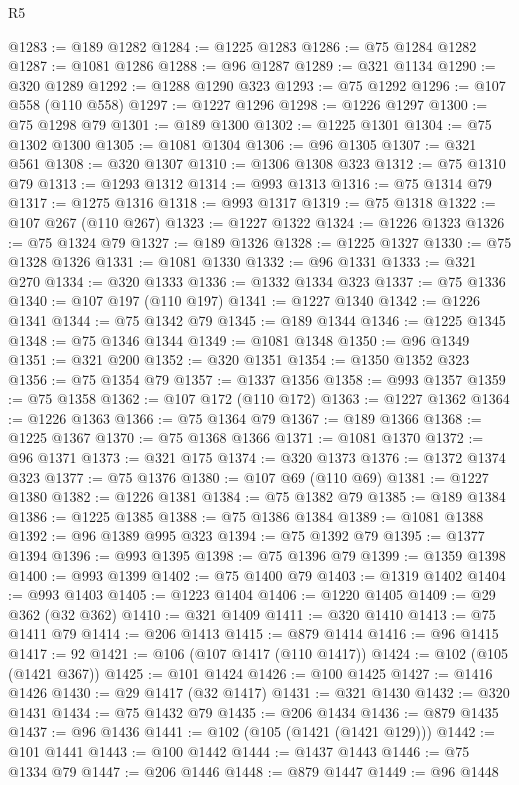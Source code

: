 \begin{lexlean}{R5}
\begin{coremodule}
@1283 := @189 @1282
@1284 := @1225 @1283
@1286 := @75 @1284 @1282
@1287 := @1081 @1286
@1288 := @96 @1287
@1289 := @321 @1134
@1290 := @320 @1289
@1292 := @1288 @1290 @323
@1293 := @75 @1292
@1296 := @107 @558 (@110 @558)
@1297 := @1227 @1296
@1298 := @1226 @1297
@1300 := @75 @1298 @79
@1301 := @189 @1300
@1302 := @1225 @1301
@1304 := @75 @1302 @1300
@1305 := @1081 @1304
@1306 := @96 @1305
@1307 := @321 @561
@1308 := @320 @1307
@1310 := @1306 @1308 @323
@1312 := @75 @1310 @79
@1313 := @1293 @1312
@1314 := @993 @1313
@1316 := @75 @1314 @79
@1317 := @1275 @1316
@1318 := @993 @1317
@1319 := @75 @1318
@1322 := @107 @267 (@110 @267)
@1323 := @1227 @1322
@1324 := @1226 @1323
@1326 := @75 @1324 @79
@1327 := @189 @1326
@1328 := @1225 @1327
@1330 := @75 @1328 @1326
@1331 := @1081 @1330
@1332 := @96 @1331
@1333 := @321 @270
@1334 := @320 @1333
@1336 := @1332 @1334 @323
@1337 := @75 @1336
@1340 := @107 @197 (@110 @197)
@1341 := @1227 @1340
@1342 := @1226 @1341
@1344 := @75 @1342 @79
@1345 := @189 @1344
@1346 := @1225 @1345
@1348 := @75 @1346 @1344
@1349 := @1081 @1348
@1350 := @96 @1349
@1351 := @321 @200
@1352 := @320 @1351
@1354 := @1350 @1352 @323
@1356 := @75 @1354 @79
@1357 := @1337 @1356
@1358 := @993 @1357
@1359 := @75 @1358
@1362 := @107 @172 (@110 @172)
@1363 := @1227 @1362
@1364 := @1226 @1363
@1366 := @75 @1364 @79
@1367 := @189 @1366
@1368 := @1225 @1367
@1370 := @75 @1368 @1366
@1371 := @1081 @1370
@1372 := @96 @1371
@1373 := @321 @175
@1374 := @320 @1373
@1376 := @1372 @1374 @323
@1377 := @75 @1376
@1380 := @107 @69 (@110 @69)
@1381 := @1227 @1380
@1382 := @1226 @1381
@1384 := @75 @1382 @79
@1385 := @189 @1384
@1386 := @1225 @1385
@1388 := @75 @1386 @1384
@1389 := @1081 @1388
@1392 := @96 @1389 @995 @323
@1394 := @75 @1392 @79
@1395 := @1377 @1394
@1396 := @993 @1395
@1398 := @75 @1396 @79
@1399 := @1359 @1398
@1400 := @993 @1399
@1402 := @75 @1400 @79
@1403 := @1319 @1402
@1404 := @993 @1403
@1405 := @1223 @1404
@1406 := @1220 @1405
@1409 := @29 @362 (@32 @362)
@1410 := @321 @1409
@1411 := @320 @1410
@1413 := @75 @1411 @79
@1414 := @206 @1413
@1415 := @879 @1414
@1416 := @96 @1415
@1417 := 92
@1421 := @106 (@107 @1417 (@110 @1417))
@1424 := @102 (@105 (@1421 @367))
@1425 := @101 @1424
@1426 := @100 @1425
@1427 := @1416 @1426
@1430 := @29 @1417 (@32 @1417)
@1431 := @321 @1430
@1432 := @320 @1431
@1434 := @75 @1432 @79
@1435 := @206 @1434
@1436 := @879 @1435
@1437 := @96 @1436
@1441 := @102 (@105 (@1421 (@1421 @129)))
@1442 := @101 @1441
@1443 := @100 @1442
@1444 := @1437 @1443
@1446 := @75 @1334 @79
@1447 := @206 @1446
@1448 := @879 @1447
@1449 := @96 @1448

\end{coremodule}
\end{lexlean}
